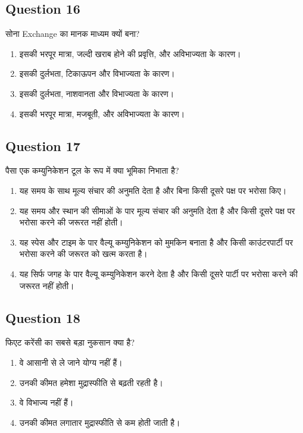 \documentclass[12pt,a4paper]{article}
\begin{document}
\subsection*{Question 16}
सोना Exchange का मानक माध्यम क्यों बना?

\begin{enumerate}[label=\Alph*., leftmargin=*]
\item इसकी भरपूर मात्रा, जल्दी खराब होने की प्रवृत्ति, और अविभाज्यता के कारण।
\item इसकी दुर्लभता, टिकाऊपन और विभाज्यता के कारण।
\item इसकी दुर्लभता, नाशवानता और विभाज्यता के कारण।
\item इसकी भरपूर मात्रा, मजबूती, और अविभाज्यता के कारण।
\end{enumerate}

\bigskip


\subsection*{Question 17}
पैसा एक कम्युनिकेशन टूल के रूप में क्या भूमिका निभाता है?

\begin{enumerate}[label=\Alph*., leftmargin=*]
\item यह समय के साथ मूल्य संचार की अनुमति देता है और बिना किसी दूसरे पक्ष पर भरोसा किए।
\item यह समय और स्थान की सीमाओं के पार मूल्य संचार की अनुमति देता है और किसी दूसरे पक्ष पर भरोसा करने की जरूरत नहीं होती।
\item यह स्पेस और टाइम के पार वैल्यू कम्युनिकेशन को मुमकिन बनाता है और किसी काउंटरपार्टी पर भरोसा करने की जरूरत को खत्म करता है।
\item यह सिर्फ जगह के पार वैल्यू कम्युनिकेशन करने देता है और किसी दूसरे पार्टी पर भरोसा करने की जरूरत नहीं होती।
\end{enumerate}

\bigskip


\subsection*{Question 18}
फिएट करेंसी का सबसे बड़ा नुकसान क्या है?

\begin{enumerate}[label=\Alph*., leftmargin=*]
\item वे आसानी से ले जाने योग्य नहीं हैं।
\item उनकी कीमत हमेशा मुद्रास्फीति से बढ़ती रहती है।
\item वे विभाज्य नहीं हैं।
\item उनकी कीमत लगातार मुद्रास्फीति से कम होती जाती है।
\end{enumerate}
\end{document}
